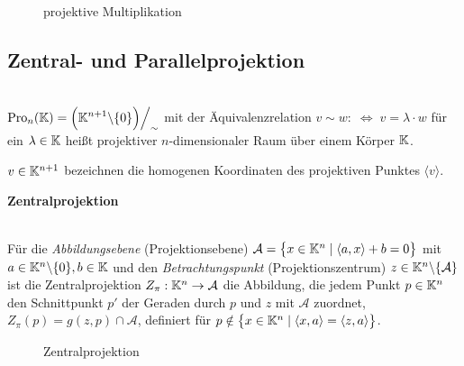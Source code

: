 \begin{description}
              \begin{figure}[h]
                
                \caption{projektive Multiplikation}
              \end{figure}
    \end{description}
  

\subsection*{Zentral- und Parallelprojektion}

    \begin{defi} \ \\
        $\displaystyle{\operatorname{Pro}_n(\mathbb K) = \Big( \mathbb K^{n+1} \backslash\lbrace 0 \rbrace \Big) \Big/_\sim }$ mit der Äquivalenzrelation 
        $v \sim w: \; \Leftrightarrow \; v= \lambda \cdot w$ für ein $\lambda \in \mathbb K$ heißt projektiver $n$-dimensionaler 
        Raum über einem Körper $\mathbb K$. \par
        $v\in \mathbb K^{n+1}$ bezeichnen die homogenen Koordinaten des projektiven Punktes $\langle v \rangle$.
    \end{defi}


  \textbf{Zentralprojektion} \par

  \begin{defi} \ \\
    Für die \textit{Abbildungsebene} (Projektionsebene) $\mathcal{A} = \big\{ x\in \mathbb K^n \mid \langle a,x \rangle + b = 0 \big\}$ 
    mit $a\in \mathbb K^{n}\backslash \{0\}, b\in \mathbb K$ und den \textit{Betrachtungspunkt} (Projektionszentrum) 
    $z\in \mathbb K^n\backslash\{ \mathcal{A} \}$ ist die Zentralprojektion $Z_\pi: \mathbb K^n \rightarrow \mathcal{A}$ die Abbildung, die 
    jedem Punkt $p\in \mathbb K^n$ den Schnittpunkt $p'$ der Geraden durch $p$ und $z$ mit $\mathcal{A}$ zuordnet, 
    $Z_\pi(p) = g(z,p) \cap \mathcal{A}$, definiert für 
    $p\notin \big\{ x\in \mathbb K^n \mid \langle x,a \rangle = \langle z,a \rangle \big\}$.
  \end{defi}



  \begin{figure}[h]
    
    \caption{Zentralprojektion}
  \end{figure}



